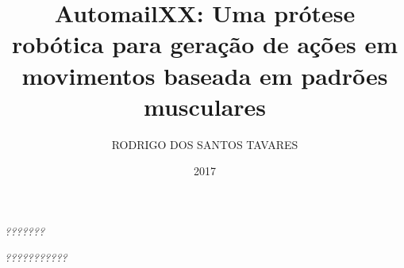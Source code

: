 \documentclass[
    12pt,       %
    oneside,    %
    a4paper,    %
%
    chapter=TITLE,	  	  %
%
    english,			  %
    brazil				  %
%
]{abntex2}
\title{AutomailXX\todo{Alterar o título}: Uma prótese robótica para geração de ações em movimentos baseada em padrões musculares}
\author{RODRIGO DOS SANTOS TAVARES}
\date{2017}
\begin{document}


\imprimircapa{}

\imprimirfolhaderosto{}

\imprimirfolhadeaprovacao{}

\begin{dedicatoria}
   \vspace*{\fill}
   \centering
   \noindent
   \textit{???????} \vspace*{\fill}%
\end{dedicatoria}

\begin{agradecimentos}
  \textcolor{red}{\lipsum[1]}%
\end{agradecimentos}

\begin{epigrafe}
    \vspace*{\fill}
	\begin{flushright}
		\textit{???????????} %
	\end{flushright}
\end{epigrafe}
\end{document}
